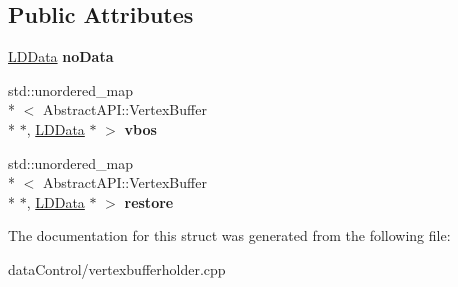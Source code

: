 \subsection*{Public Attributes}
\begin{DoxyCompactItemize}
\item 
\hypertarget{struct_vertex_buffer_holder_1_1_data_a9a0e80f75a785930b4d48a7afac0c7b1}{\hyperlink{struct_vertex_buffer_holder_1_1_data_1_1_l_d_data}{L\+D\+Data} {\bfseries no\+Data}}\label{struct_vertex_buffer_holder_1_1_data_a9a0e80f75a785930b4d48a7afac0c7b1}

\item 
\hypertarget{struct_vertex_buffer_holder_1_1_data_a77fa39e74d7cb941394b9a4c74a24d95}{std\+::unordered\+\_\+map\\*
$<$ Abstract\+A\+P\+I\+::\+Vertex\+Buffer \\*
$\ast$, \hyperlink{struct_vertex_buffer_holder_1_1_data_1_1_l_d_data}{L\+D\+Data} $\ast$ $>$ {\bfseries vbos}}\label{struct_vertex_buffer_holder_1_1_data_a77fa39e74d7cb941394b9a4c74a24d95}

\item 
\hypertarget{struct_vertex_buffer_holder_1_1_data_ae26dba46284f76e8a449355bdef4ffa0}{std\+::unordered\+\_\+map\\*
$<$ Abstract\+A\+P\+I\+::\+Vertex\+Buffer \\*
$\ast$, \hyperlink{struct_vertex_buffer_holder_1_1_data_1_1_l_d_data}{L\+D\+Data} $\ast$ $>$ {\bfseries restore}}\label{struct_vertex_buffer_holder_1_1_data_ae26dba46284f76e8a449355bdef4ffa0}

\end{DoxyCompactItemize}


The documentation for this struct was generated from the following file\+:\begin{DoxyCompactItemize}
\item 
data\+Control/vertexbufferholder.\+cpp\end{DoxyCompactItemize}
